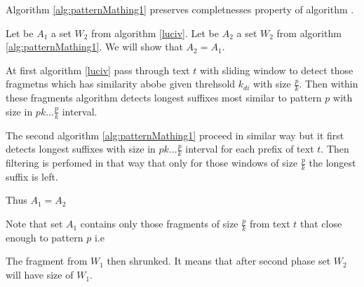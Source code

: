 \begin{theorem}
Algorithm \ref{alg:patternMathing1} preserves completnesses property of algorithm \cite{luciv2019interactive}.

\end{theorem}

Let be $A_1$ a set $W_{2}$ from algorithm \ref{luciv}.
Let be $A_2$ a set $W_{2}$ from algorithm \ref{alg:patternMathing1}.
We will show that $A_2 = A_1$.

At first algorithm \ref{luciv} pass through text $t$ with sliding window to detect those fragmetns which has similarity abobe given threhsold $k_{di}$ with size $\frac{p}{k}$.
Then within these fragments algorithm detects longest suffixes most similar to pattern $p$ with size in  $pk...\frac{p}{k}$ interval.

The second algorithm \ref{alg:patternMathing1} proceed in similar way but it first detects longest suffixes with size in $pk...\frac{p}{k}$ interval for each prefix of text $t$.
Then filtering is perfomed in that way that only for those windows of size $\frac{p}{k}$ the longest suffix is left.

Thus $A_1=A_2$  



  

Note that set $A_{1}$ contains only those fragments of size $\frac{p}{k}$ from text $t$ that close enough to pattern $p$ i.e 

The fragment from $W_{1}$ then shrunked.
It means that after second phase set $W_{2}$ will have size  of $W_{1}$. 
